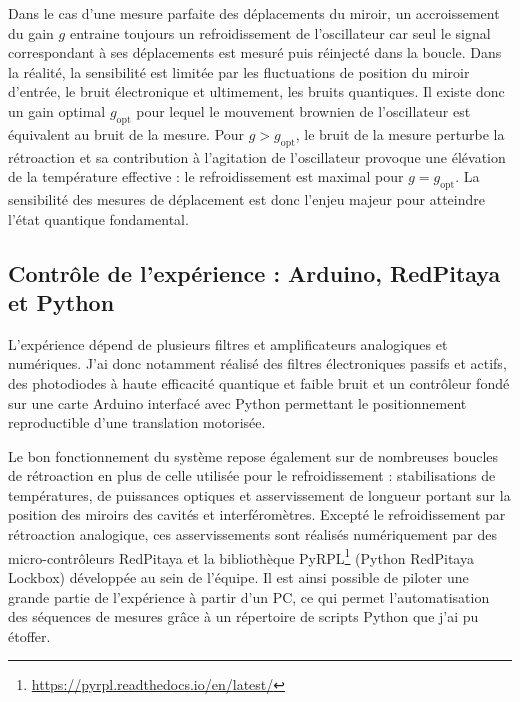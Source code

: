 \documentclass[12pt,a4paper]{article}
\begin{document}
Dans le cas d'une mesure parfaite des déplacements du miroir, un accroissement du gain $g$ entraine toujours un refroidissement de l'oscillateur car seul le signal correspondant à ses déplacements est mesuré puis réinjecté dans la boucle.
Dans la réalité, la sensibilité est limitée par les fluctuations de position du miroir d'entrée, le bruit électronique et ultimement, les bruits quantiques.
Il existe donc un gain optimal $g_\mathrm{opt}$ pour lequel le mouvement brownien de l'oscillateur est équivalent au bruit de la mesure.
Pour $g>g_\mathrm{opt}$, le bruit de la mesure perturbe la rétroaction et sa contribution à l'agitation de l'oscillateur provoque une élévation de la température effective : le refroidissement est maximal pour $g=g_\mathrm{opt}$.
La sensibilité des mesures de déplacement est donc l'enjeu majeur pour atteindre l'état quantique fondamental.

\subsection{Contrôle de l'expérience : Arduino, RedPitaya et Python}
\label{sec:controls}

L'expérience dépend de plusieurs filtres et amplificateurs analogiques et numériques.
J'ai donc notamment réalisé des filtres électroniques passifs et actifs, des photodiodes à haute efficacité quantique et faible bruit et un contrôleur fondé sur une carte Arduino interfacé avec Python permettant le positionnement reproductible d'une translation motorisée.

Le bon fonctionnement du système repose également sur de nombreuses boucles de rétroaction en plus de celle utilisée pour le refroidissement : stabilisations de températures, de puissances optiques et asservissement de longueur portant sur la position des miroirs des cavités et interféromètres.
Excepté le refroidissement par rétroaction analogique, ces asservissements sont réalisés numériquement par des micro-contrôleurs RedPitaya et la bibliothèque PyRPL\footnote{\url{https://pyrpl.readthedocs.io/en/latest/}} (Python RedPitaya Lockbox) développée au sein de l'équipe.
Il est ainsi possible de piloter une grande partie de l'expérience à partir d'un PC, ce qui permet l'automatisation des séquences de mesures grâce à un répertoire de scripts Python que j'ai pu étoffer.
\end{document}

